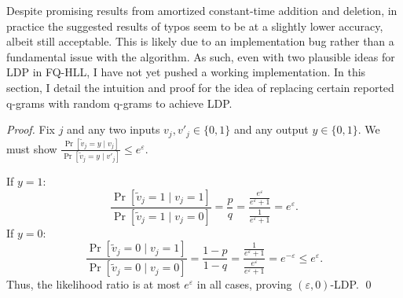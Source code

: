 \documentclass[12pt,a4paper]{article}
\begin{document}

\vspace{1.0em}

Despite promising results from amortized constant-time addition and deletion, in practice the suggested results of typos seem to be at a slightly lower accuracy, albeit still acceptable. This is likely due to an implementation bug rather than a fundamental issue with the algorithm. As such, even with two plausible ideas for LDP in FQ-HLL, I have not yet pushed a working implementation. In this section, I detail the intuition and proof for the idea of replacing certain reported q-grams with random q-grams to achieve LDP. \newline



\noindent \textit{Proof.}
Fix $j$ and any two inputs $v_j, v'_j \in \{0, 1\}$ and any output $y \in \{0, 1\}$.
We must show $\frac{\Pr[\tilde v_j = y \mid v_j]}{\Pr[\tilde v_j = y \mid v'_j]} \leq e^{\varepsilon}$.

\noindent If $y = 1$:
\[
\frac{\Pr[\tilde v_j = 1 \mid v_j = 1]}{\Pr[\tilde v_j = 1 \mid v_j = 0]} = \frac{p}{q}
=\frac{\tfrac{e^{\varepsilon}}{e^{\varepsilon} + 1}}{\tfrac{1}{e^{\varepsilon} + 1}}=e^{\varepsilon}.
\]
If $y = 0$:
\[
\frac{\Pr[\tilde v_j = 0 \mid v_j = 1]}{\Pr[\tilde v_j = 0 \mid v_j = 0]}
=\frac{1 - p}{1 - q}
=\frac{\tfrac{1}{e^{\varepsilon} + 1}}{\tfrac{e^{\varepsilon}}{e^{\varepsilon} + 1}}=e^{-\varepsilon}\leq e^{\varepsilon}.
\]
Thus, the likelihood ratio is at most $e^{\varepsilon}$ in all cases, proving $(\varepsilon, 0)$-LDP. \qed
\end{document}
